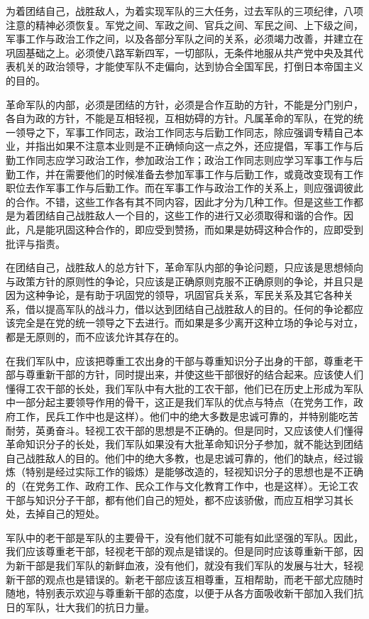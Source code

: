 为着团结自己，战胜敌人，为着实现军队的三大任务，过去军队的三项纪律，八项注意的精神必须恢复。军党之间、军政之间、官兵之间、军民之间、上下级之间，军事工作与政治工作之间，以及各部分军队之间的关系，必须竭力改善，并建立在巩固基础之上。必须使八路军新四军，一切部队，无条件地服从共产党中央及其代表机关的政治领导，才能使军队不走偏向，达到协合全国军民，打倒日本帝国主义的目的。

革命军队的内部，必须是团结的方针，必须是合作互助的方针，不能是分门别户，各自为政的方针，不能是互相轻视，互相妨碍的方针。凡属革命的军队，在党的统一领导之下，军事工作同志，政治工作同志与后勤工作同志，除应强调专精自己本业，并指出如果不注意本业则是不正确倾向这一点之外，还应提倡，军事工作与后勤工作同志应学习政治工作，参加政治工作；政治工作同志则应学习军事工作与后勤工作，并在需要他们的时候准备去参加军事工作与后勤工作，或竟改变现有工作职位去作军事工作与后勤工作。而在军事工作与政治工作的关系上，则应强调彼此的合作。不错，这些工作各有其不同内容，因此才分为几种工作。但是这些工作都是为着团结自己战胜敌人一个目的，这些工作的进行又必须取得和谐的合作。因此，凡是能巩固这种合作的，即应受到赞扬，而如果是妨碍这种合作的，应即受到批评与指责。

在团结自己，战胜敌人的总方针下，革命军队内部的争论问题，只应该是思想倾向与政策方针的原则性的争论，只应该是正确原则克服不正确原则的争论，并且只是因为这种争论，是有助于巩固党的领导，巩固官兵关系，军民关系及其它各种关系，借以提高军队的战斗力，借以达到团结自己战胜敌人的目的。任何的争论都应该完全是在党的统一领导之下去进行。而如果是多少离开这种立场的争论与对立，都是无原则的，而不应该允许其存在的。

在我们军队中，应该把尊重工农出身的干部与尊重知识分子出身的干部，尊重老干部与尊重新干部的方针，同时提出来，并使这些干部很好的结合起来。应该使人们懂得工农干部的长处，我们军队中有大批的工农干部，他们已在历史上形成为军队中一部分起主要领导作用的骨干，这正是我们军队的优点与特点（在党务工作，政府工作，民兵工作中也是这样）。他们中的绝大多数是忠诚可靠的，并特别能吃苦耐劳，英勇奋斗。轻视工农干部的思想是不正确的。但是同时，又应该使人们懂得革命知识分子的长处，我们军队如果没有大批革命知识分子参加，就不能达到团结自己战胜敌人的目的。他们中的绝大多教，也是忠诚可靠的，他们的缺点，经过锻炼（特别是经过实际工作的锻炼）是能够改造的，轻视知识分子的思想也是不正确的（在党务工作、政府工作、民众工作与文化教育工作中，也是这样）。无论工农干部与知识分子干部，都有他们自己的短处，都不应该骄傲，而应互相学习其长处，去掉自己的短处。

军队中的老干部是军队的主要骨干，没有他们就不可能有如此坚强的军队。因此，我们应该尊重老干部，轻视老干部的观点是错误的。但是同时应该尊重新干部，因为新干部是我们军队的新鲜血液，没有他们，就没有我们军队的发展与壮大，轻视新干部的观点也是错误的。新老干部应该互相尊重，互相帮助，而老干部尤应随时随地，特别表示欢迎与尊重新干部的态度，以便于从各方面吸收新干部加入我们抗日的军队，壮大我们的抗日力量。


